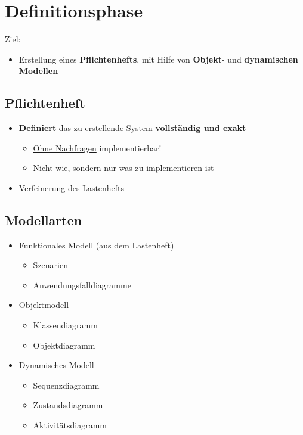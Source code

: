 \section{Definitionsphase}

	Ziel:
	\begin{itemize}
		\item Erstellung eines \textbf{Pflichtenhefts}, mit Hilfe von \textbf{Objekt}- und \textbf{dynamischen Modellen}
	\end{itemize}
		
		\subsection{Pflichtenheft}
			
			\begin{itemize}
				\item  \textbf{Definiert} das zu erstellende System \textbf{vollständig und exakt}
				\begin{itemize}
					\item \underline{Ohne Nachfragen} implementierbar!
					\item Nicht wie, sondern nur \underline{was zu implementieren} ist
				\end{itemize}
				\item Verfeinerung des Lastenhefts
			\end{itemize}
				
		\subsection{Modellarten}
				
			\begin{itemize}
				\item Funktionales Modell (aus dem Lastenheft)
				\begin{itemize}
					\item Szenarien
					\item Anwendungsfalldiagramme
				\end{itemize}
				\item Objektmodell
				\begin{itemize}
					\item Klassendiagramm
					\item Objektdiagramm
				\end{itemize}
				\item Dynamisches Modell
				\begin{itemize}
					\item Sequenzdiagramm
					\item Zustandsdiagramm
					\item Aktivitätsdiagramm
				\end{itemize}
			\end{itemize}
				
